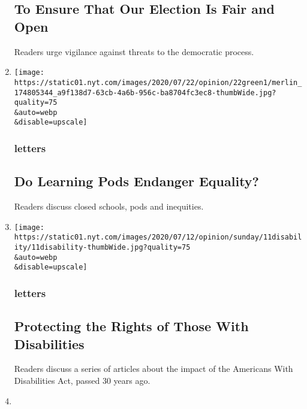 \begin{enumerate}
{  \subsection{To Ensure That Our Election Is Fair and
  Open}\label{to-ensure-that-our-election-is-fair-and-open}}

  Readers urge vigilance against threats to the democratic process.
\item
  \href{/2020/08/02/opinion/letters/virus-education.html}{}

  \texttt{[image: https://static01.nyt.com/images/2020/07/22/opinion/22green1/merlin\_174805344\_a9f138d7-63cb-4a6b-956c-ba8704fc3ec8-thumbWide.jpg?quality=75\\\&auto=webp\\\&disable=upscale]}

  \hypertarget{letters-5}{%
  \subsubsection{letters}\label{letters-5}}

  \hypertarget{do-learning-pods-endanger-equality}{%
  \subsection{Do Learning Pods Endanger
  Equality?}\label{do-learning-pods-endanger-equality}}

  Readers discuss closed schools, pods and inequities.
\item
  \href{/2020/08/01/opinion/letters/disability-law.html}{}

  \texttt{[image: https://static01.nyt.com/images/2020/07/12/opinion/sunday/11disability/11disability-thumbWide.jpg?quality=75\\\&auto=webp\\\&disable=upscale]}

  \hypertarget{letters-6}{%
  \subsubsection{letters}\label{letters-6}}

  \hypertarget{protecting-the-rights-of-those-with-disabilities}{%
  \subsection{Protecting the Rights of Those With
  Disabilities}\label{protecting-the-rights-of-those-with-disabilities}}

  Readers discuss a series of articles about the impact of the Americans
  With Disabilities Act, passed 30 years ago.
\item
  \href{/2020/07/31/opinion/letters/coronavirus-economy.html}{}


\end{enumerate}

